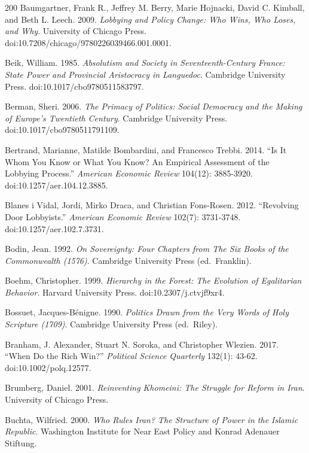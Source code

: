 \documentclass[11pt,letterpaper]{article}
\theoremstyle{definition}
\theoremstyle{remark}
\begin{document}
\begin{thebibliography}{200}
Baumgartner, Frank R., Jeffrey M. Berry, Marie Hojnacki, David C. Kimball, and Beth L. Leech. 2009. \emph{Lobbying and Policy Change: Who Wins, Who Loses, and Why}. University of Chicago Press. doi:10.7208/chicago/9780226039466.001.0001.

Beik, William. 1985. \emph{Absolutism and Society in Seventeenth-Century France: State Power and Provincial Aristocracy in Languedoc}. Cambridge University Press. doi:10.1017/cbo9780511583797.

Berman, Sheri. 2006. \emph{The Primacy of Politics: Social Democracy and the Making of Europe's Twentieth Century}. Cambridge University Press. doi:10.1017/cbo9780511791109.

Bertrand, Marianne, Matilde Bombardini, and Francesco Trebbi. 2014. ``Is It Whom You Know or What You Know? An Empirical Assessment of the Lobbying Process.'' \emph{American Economic Review} 104(12): 3885-3920. doi:10.1257/aer.104.12.3885.

Blanes i Vidal, Jordi, Mirko Draca, and Christian Fons-Rosen. 2012. ``Revolving Door Lobbyists.'' \emph{American Economic Review} 102(7): 3731-3748. doi:10.1257/aer.102.7.3731.

Bodin, Jean. 1992. \emph{On Sovereignty: Four Chapters from The Six Books of the Commonwealth (1576)}. Cambridge University Press (ed.~Franklin).

Boehm, Christopher. 1999. \emph{Hierarchy in the Forest: The Evolution of Egalitarian Behavior}. Harvard University Press. doi:10.2307/j.ctvjf9xr4.

Bossuet, Jacques-B\'enigne. 1990. \emph{Politics Drawn from the Very Words of Holy Scripture (1709)}. Cambridge University Press (ed.~Riley).

Branham, J. Alexander, Stuart N. Soroka, and Christopher Wlezien. 2017. ``When Do the Rich Win?'' \emph{Political Science Quarterly} 132(1): 43-62. doi:10.1002/polq.12577.

Brumberg, Daniel. 2001. \emph{Reinventing Khomeini: The Struggle for Reform in Iran}. University of Chicago Press.

Buchta, Wilfried. 2000. \emph{Who Rules Iran? The Structure of Power in the Islamic Republic}. Washington Institute for Near East Policy and Konrad Adenauer Stiftung.


\end{thebibliography}
\end{document}
